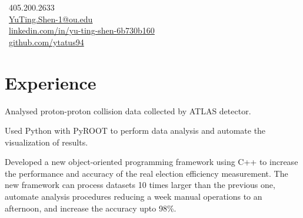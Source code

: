 \documentclass[letterpaper]{deedy-resume-openfont}
\begin{document}
%
%
\lastupdated

%
%

{
    \faPhone \ 405.200.2633\\
    \faEnvelope \ \href{mailto:YuTing.Shen-1@ou.edu}{YuTing.Shen-1@ou.edu}\\
    \faLinkedinSquare \ \href{https://www.linkedin.com/in/yu-ting-shen-6b730b160/}{linkedin.com/in/yu-ting-shen-6b730b160}\\
    \faGithub \ \href{https://github.com/ytatus94}{github.com/ytatus94}
}




\section{Experience}

\begin{tightemize}
\item Analysed proton-proton collision data collected by ATLAS detector.
\item Used Python with PyROOT to perform data analysis and automate the visualization of results.
\item Developed a new object-oriented programming framework using C++ to increase the performance and accuracy of the real election efficiency measurement. The new framework can process datasets 10 times larger than the previous one, automate analysis procedures reducing a week manual operations to an afternoon, and increase the accuracy upto 98\%.
\end{tightemize}
\sectionsep
\end{document}
